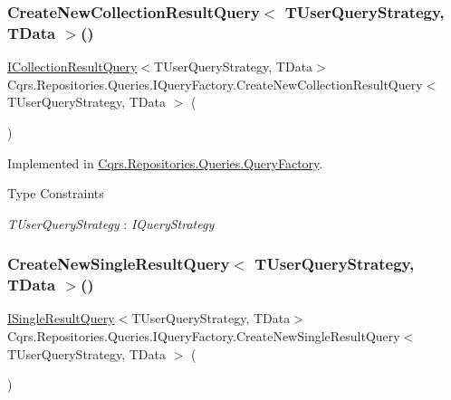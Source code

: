 \subsubsection{\texorpdfstring{Create\+New\+Collection\+Result\+Query$<$ T\+User\+Query\+Strategy, T\+Data $>$()}{CreateNewCollectionResultQuery< TUserQueryStrategy, TData >()}}
{\footnotesize\ttfamily \hyperlink{interfaceCqrs_1_1Repositories_1_1Queries_1_1ICollectionResultQuery}{I\+Collection\+Result\+Query}$<$T\+User\+Query\+Strategy, T\+Data$>$ Cqrs.\+Repositories.\+Queries.\+I\+Query\+Factory.\+Create\+New\+Collection\+Result\+Query$<$ T\+User\+Query\+Strategy, T\+Data $>$ (\begin{DoxyParamCaption}{ }\end{DoxyParamCaption})}



Implemented in \hyperlink{classCqrs_1_1Repositories_1_1Queries_1_1QueryFactory_aaadcf9eb14390c49d668023a9e9950d7}{Cqrs.\+Repositories.\+Queries.\+Query\+Factory}.

\begin{Desc}
\item[Type Constraints]\begin{description}
\item[{\em T\+User\+Query\+Strategy} : {\em I\+Query\+Strategy}]\end{description}
\end{Desc}
\mbox{\label{interfaceCqrs_1_1Repositories_1_1Queries_1_1IQueryFactory_a237aee0f99d8bfc03d8f10595f16ecea}} 
\subsubsection{\texorpdfstring{Create\+New\+Single\+Result\+Query$<$ T\+User\+Query\+Strategy, T\+Data $>$()}{CreateNewSingleResultQuery< TUserQueryStrategy, TData >()}}
{\footnotesize\ttfamily \hyperlink{interfaceCqrs_1_1Repositories_1_1Queries_1_1ISingleResultQuery}{I\+Single\+Result\+Query}$<$T\+User\+Query\+Strategy, T\+Data$>$ Cqrs.\+Repositories.\+Queries.\+I\+Query\+Factory.\+Create\+New\+Single\+Result\+Query$<$ T\+User\+Query\+Strategy, T\+Data $>$ (\begin{DoxyParamCaption}{ }\end{DoxyParamCaption})}



